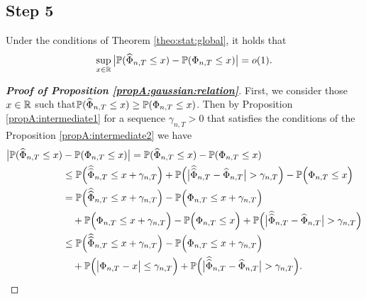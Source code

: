 \documentclass[a4paper,12pt]{article}
\newcommand{\doublehattwo}[1]{\widehat{\widehat{#1}}}
\begin{document}
\subsection*{Step 5}
\begin{propA}\label{propA:gaussian:relation}
Under the conditions of Theorem \ref{theo:stat:global}, it holds that 
\begin{equation}\label{eqA:gaussian:relation}
\sup_{x \in \mathbb{R}} \big| \mathbb{P}(\widehat{\Phi}_{n, T} \le x) - \mathbb{P}(\Phi_{n,T} \le x) \big| = o(1).
\end{equation}
\end{propA}
\begin{proof}[\textnormal{\textbf{Proof of Proposition \ref{propA:gaussian:relation}}}] 
First, we consider those $x\in \mathbb{R}$ such that\linebreak $\mathbb{P}(\widehat{\Phi}_{n,T} \le x) \geq \mathbb{P}(\Phi_{n, T} \le x)$. Then by Proposition \ref{propA:intermediate1} for a sequence $\gamma_{n, T}>0$ that satisfies the conditions of the Proposition \ref{propA:intermediate2} we have
\begin{align*}
\big| \pr(\widehat{\Phi}_{n, T} \le x) &- \pr(\Phi_{n,T} \le x) \big| = \pr(\widehat{\Phi}_{n, T} \le x) - \pr(\Phi_{n,T} \le x)  \\
&\le \pr\Big(\doublehattwo{\Phi}_{n,T} \le x + \gamma_{n, T}\Big) + \pr \Big(\big|\doublehattwo{\Phi}_{n,T} - \widehat{\Phi}_{n,T}\big| > \gamma_{n, T} \Big)   - \pr\Big(\Phi_{n,T} \le x\Big)  \\
&= \pr\Big(\doublehattwo{\Phi}_{n,T} \le x + \gamma_{n, T}\Big) - \pr\Big(\Phi_{n,T} \le x + \gamma_{n, T}\Big)  \\
& \quad +  \pr\Big(\Phi_{n,T} \le x + \gamma_{n, T}\Big)   - \pr\Big(\Phi_{n,T} \le x\Big) + \pr \Big(\big|\doublehattwo{\Phi}_{n,T} - \widehat{\Phi}_{n,T}\big| > \gamma_{n, T} \Big) \\
&\le \pr\Big(\doublehattwo{\Phi}_{n,T} \le x + \gamma_{n, T}\Big) - \pr\Big(\Phi_{n,T} \le x + \gamma_{n, T}\Big) \\
&\quad + \pr\Big(\big|\Phi_{n,T} - x \big| \le \gamma_{n, T}\Big) + \pr \Big(\big|\doublehattwo{\Phi}_{n,T} - \widehat{\Phi}_{n,T}\big| > \gamma_{n, T} \Big).
\end{align*}


\end{proof}
\end{document}
